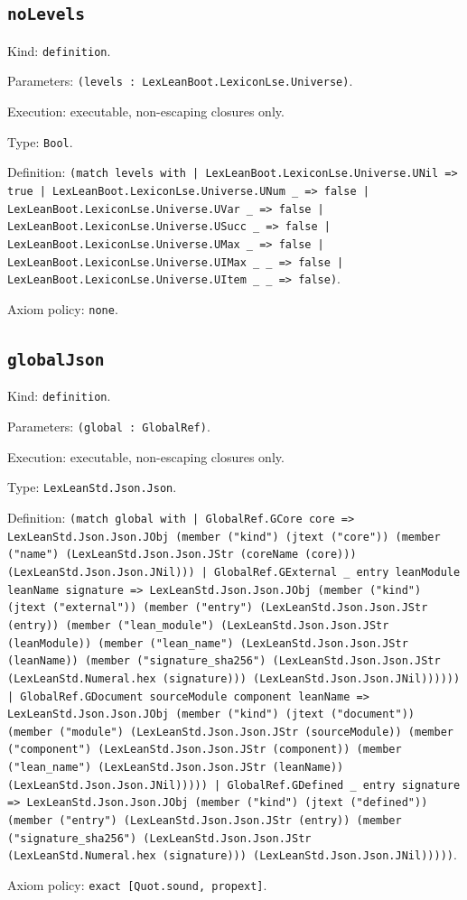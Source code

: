 \documentclass[11pt]{article}
\begin{document}
\subsection*{\texttt{noLevels}}
\noindent Kind: \texttt{definition}.\par
\noindent Parameters: \texttt{(levels : LexLeanBoot.LexiconLse.Universe)}.\par
\noindent Execution: executable, non-escaping closures only.\par
\noindent Type: \texttt{Bool}.\par
\noindent Definition: \texttt{(match levels with | LexLeanBoot.LexiconLse.Universe.UNil => true | LexLeanBoot.LexiconLse.Universe.UNum \_ => false | LexLeanBoot.LexiconLse.Universe.UVar \_ => false | LexLeanBoot.LexiconLse.Universe.USucc \_ => false | LexLeanBoot.LexiconLse.Universe.UMax \_ => false | LexLeanBoot.LexiconLse.Universe.UIMax \_ \_ => false | LexLeanBoot.LexiconLse.Universe.UItem \_ \_ => false)}.\par
\noindent Axiom policy: \texttt{none}.\par
\subsection*{\texttt{globalJson}}
\noindent Kind: \texttt{definition}.\par
\noindent Parameters: \texttt{(global : GlobalRef)}.\par
\noindent Execution: executable, non-escaping closures only.\par
\noindent Type: \texttt{LexLeanStd.Json.Json}.\par
\noindent Definition: \texttt{(match global with | GlobalRef.GCore core => LexLeanStd.Json.Json.JObj (member ("kind") (jtext ("core")) (member ("name") (LexLeanStd.Json.Json.JStr (coreName (core))) (LexLeanStd.Json.Json.JNil))) | GlobalRef.GExternal \_ entry leanModule leanName signature => LexLeanStd.Json.Json.JObj (member ("kind") (jtext ("external")) (member ("entry") (LexLeanStd.Json.Json.JStr (entry)) (member ("lean\_module") (LexLeanStd.Json.Json.JStr (leanModule)) (member ("lean\_name") (LexLeanStd.Json.Json.JStr (leanName)) (member ("signature\_sha256") (LexLeanStd.Json.Json.JStr (LexLeanStd.Numeral.hex (signature))) (LexLeanStd.Json.Json.JNil)))))) | GlobalRef.GDocument sourceModule component leanName => LexLeanStd.Json.Json.JObj (member ("kind") (jtext ("document")) (member ("module") (LexLeanStd.Json.Json.JStr (sourceModule)) (member ("component") (LexLeanStd.Json.Json.JStr (component)) (member ("lean\_name") (LexLeanStd.Json.Json.JStr (leanName)) (LexLeanStd.Json.Json.JNil))))) | GlobalRef.GDefined \_ entry signature => LexLeanStd.Json.Json.JObj (member ("kind") (jtext ("defined")) (member ("entry") (LexLeanStd.Json.Json.JStr (entry)) (member ("signature\_sha256") (LexLeanStd.Json.Json.JStr (LexLeanStd.Numeral.hex (signature))) (LexLeanStd.Json.Json.JNil)))))}.\par
\noindent Axiom policy: \texttt{exact [Quot.sound, propext]}.\par
\end{document}
